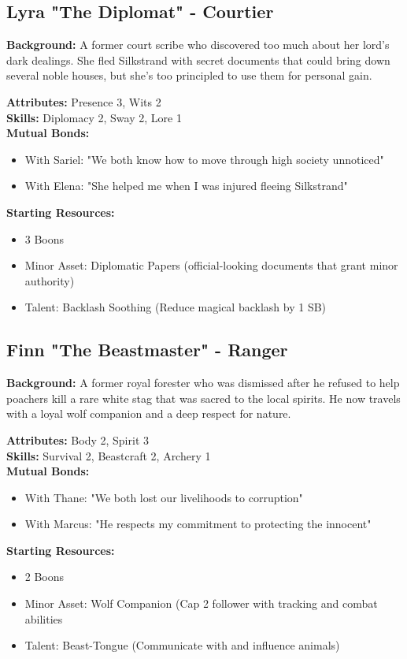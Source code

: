 \documentclass[11pt]{article}
\newenvironment{characterbox}[1]{%
  \begin{mdframed}[backgroundcolor=shadecolor, linewidth=1pt, linecolor=headercolor]%
  \subsection*{#1}%
}{%
  \end{mdframed}%
}
\begin{document}
\begin{characterbox}{Lyra "The Diplomat" - Courtier}
\textbf{Background:} A former court scribe who discovered too much about her lord's dark dealings. She fled Silkstrand with secret documents that could bring down several noble houses, but she's too principled to use them for personal gain.

\textbf{Attributes:} Presence 3, Wits 2 \\
\textbf{Skills:} Diplomacy 2, Sway 2, Lore 1 \\
\textbf{Mutual Bonds:} 
\begin{itemize}
\item With Sariel: "We both know how to move through high society unnoticed"
\item With Elena: "She helped me when I was injured fleeing Silkstrand"
\end{itemize}

\textbf{Starting Resources:}
\begin{itemize}
\item 3 Boons
\item Minor Asset: Diplomatic Papers (official-looking documents that grant minor authority)
\item Talent: Backlash Soothing (Reduce magical backlash by 1 SB)
\end{itemize}
\end{characterbox}

\begin{characterbox}{Finn "The Beastmaster" - Ranger}
\textbf{Background:} A former royal forester who was dismissed after he refused to help poachers kill a rare white stag that was sacred to the local spirits. He now travels with a loyal wolf companion and a deep respect for nature.

\textbf{Attributes:} Body 2, Spirit 3 \\
\textbf{Skills:} Survival 2, Beastcraft 2, Archery 1 \\
\textbf{Mutual Bonds:} 
\begin{itemize}
\item With Thane: "We both lost our livelihoods to corruption"
\item With Marcus: "He respects my commitment to protecting the innocent"
\end{itemize}

\textbf{Starting Resources:}
\begin{itemize}
\item 2 Boons
\item Minor Asset: Wolf Companion (Cap 2 follower with tracking and combat abilities
\item Talent: Beast-Tongue (Communicate with and influence animals)
\end{itemize}
\end{characterbox}
\end{document}
